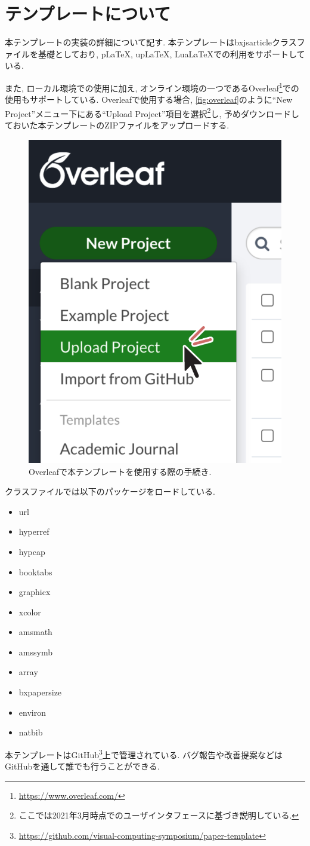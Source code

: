 \documentclass{vc}
\begin{document}
\section{テンプレートについて}

本テンプレートの実装の詳細について記す.
本テンプレートは\textsf{bxjsarticle}クラスファイルを基礎としており, pLaTeX, upLaTeX, LuaLaTeXでの利用をサポートしている.

また, ローカル環境での使用に加え, オンライン環境の一つであるOverleaf\footnote{\url{https://www.overleaf.com/}}での使用もサポートしている.
Overleafで使用する場合, \autoref{fig:overleaf}のように``New Project''メニュー下にある``Upload Project''項目を選択\footnote{ここでは2021年3月時点でのユーザインタフェースに基づき説明している.}し, 予めダウンロードしておいた本テンプレートのZIPファイルをアップロードする.

\begin{figure}
  \centering
  \includegraphics[width=.5\columnwidth]{./figures/overleaf.pdf}
  \caption{Overleafで本テンプレートを使用する際の手続き.}
  \label{fig:overleaf}
\end{figure}

クラスファイルでは以下のパッケージをロードしている.
\begin{itemize}
  \item \textsf{url}
  \item \textsf{hyperref}
  \item \textsf{hypcap}
  \item \textsf{booktabs}
  \item \textsf{graphicx}
  \item \textsf{xcolor}
  \item \textsf{amsmath}
  \item \textsf{amssymb}
  \item \textsf{array}
  \item \textsf{bxpapersize}
  \item \textsf{environ}
  \item \textsf{natbib}
\end{itemize}

本テンプレートはGitHub\footnote{\url{https://github.com/visual-computing-symposium/paper-template}}上で管理されている.
バグ報告や改善提案などはGitHubを通して誰でも行うことができる.



\end{document}
